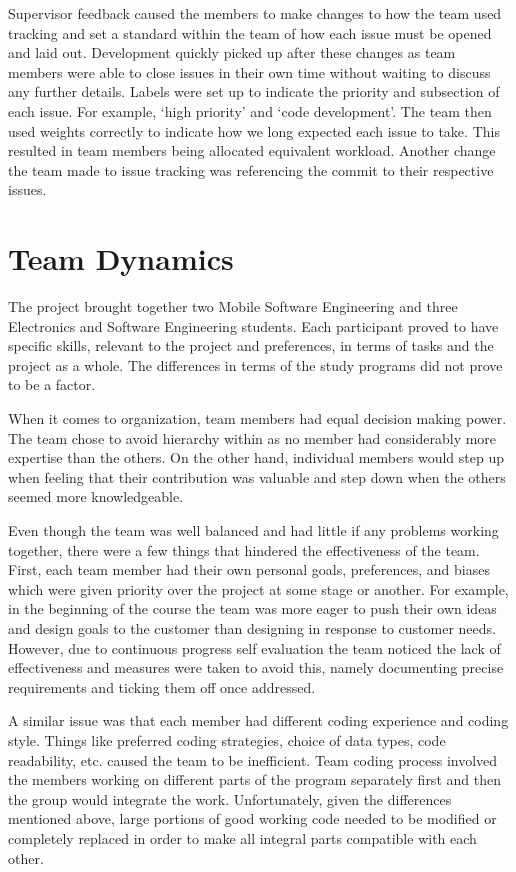 \documentclass{l3proj}
\begin{document}
Supervisor feedback caused the members to make changes to how the team used tracking and set a standard within the team of how each issue must be opened and laid out. Development quickly picked up after these changes as team members were able to close issues in their own time without waiting to discuss any further details. Labels were set up to indicate the priority and subsection of each issue. For example, ‘high priority' and ‘code development'. The team then used weights correctly to indicate how we long expected each issue to take. This resulted in team members being allocated equivalent workload. Another change the team made to issue tracking was referencing the commit to their respective issues.

\section{Team Dynamics}
\label{sec:teamdynamics}

The project brought together two Mobile Software Engineering and three Electronics and Software Engineering students. Each participant proved to have specific skills, relevant to the project and preferences, in terms of tasks and the project as a whole. The differences in terms of the study programs did not prove to be a factor.
 
When it comes to organization, team members had equal decision making power. The team chose to avoid hierarchy within as no member had considerably more expertise than the others. On the other hand, individual members would step up when feeling that their contribution was valuable and step down when the others seemed more knowledgeable. 

Even though the team was well balanced and had little if any problems working together, there were a few things that hindered the effectiveness of the team. First, each team member had their own personal goals, preferences, and biases which were given priority over the project at some stage or another. For example, in the beginning of the course the team was more eager to push their own ideas and design goals to the customer than designing in response to customer needs. However, due to continuous progress self evaluation the team noticed the lack of effectiveness and measures were taken to avoid this, namely documenting precise requirements and ticking them off once addressed. 

A similar issue was that each member had different coding experience and coding style. Things like preferred coding strategies, choice of data types, code readability, etc. caused the team to be inefficient. Team coding process involved the members working on different parts of the program separately first and then the group would integrate the work. Unfortunately, given the differences mentioned above, large portions of good working code needed to be modified or completely replaced in order to make all integral parts compatible with each other. 
\end{document}
